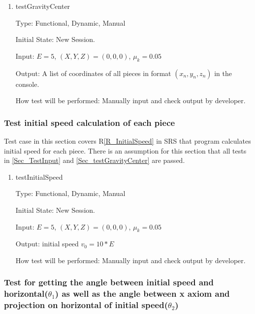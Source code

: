 \documentclass[12pt, titlepage]{article}
\newcommand{\rref}[1]{R\ref{#1}}
\begin{document}
\begin{enumerate}

\item{testGravityCenter\\}

Type: Functional, Dynamic, Manual

Initial State: New Session.

Input: $E = 5$, $(X,Y,Z) = (0,0,0)$, $\mu_{k} = 0.05$  

Output: A list of coordinates of all pieces in format $(x_{n},y_{n},z_{n})$ in the console.

How test will be performed: Manually input and check output by developer.

\end{enumerate}

\subsubsection{Test initial speed calculation of each piece}
\label{Sec_TestForInitialSpeed}

Test case in this section covers \rref{R_InitialSpeed} in SRS that program calculates initial speed for each piece.
There is an assumption for this section that all tests in \ref{Sec_TestInput} and \ref{Sec_testGravityCenter} are passed.
\begin{enumerate}

\item{testInitialSpeed\\}

Type: Functional, Dynamic, Manual

Initial State: New Session.

Input: $E = 5$, $(X,Y,Z) = (0,0,0)$, $\mu_{k} = 0.05$  

Output: initial speed $v_{0} = 10 * E$

How test will be performed: Manually input and check output by developer.

\end{enumerate}

\subsubsection{Test for getting the angle between initial speed and horizontal($\theta _{1}$) as well as the angle between x axiom and projection on horizontal of initial speed($\theta _{2}$)}
\label{Sec_TestForAngle}
\end{document}
